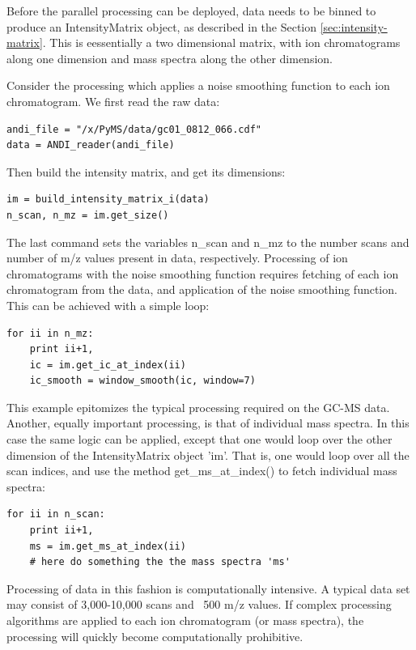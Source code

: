 Before the parallel processing can be deployed, data needs to be binned
to produce an IntensityMatrix object, as described in the Section
\ref{sec:intensity-matrix}. This is eessentially a two dimensional
matrix, with ion chromatograms along one dimension and mass spectra
along the other dimension.

Consider the processing which applies a noise smoothing function to
each ion chromatogram. We first read the raw data:

\begin{verbatim}
andi_file = "/x/PyMS/data/gc01_0812_066.cdf"
data = ANDI_reader(andi_file)
\end{verbatim}
 
Then build the intensity matrix, and get its dimensions:

\begin{verbatim}
im = build_intensity_matrix_i(data)
n_scan, n_mz = im.get_size()
\end{verbatim}

The last command sets the variables n\_scan and n\_mz to the number
scans and number of m/z values present in data, respectively.
Processing of ion chromatograms with the noise smoothing function
requires fetching of each ion chromatogram from the data, and
application of the noise smoothing function. This can be achieved 
with a simple loop: 

\begin{verbatim}
for ii in n_mz:
    print ii+1,
    ic = im.get_ic_at_index(ii)
    ic_smooth = window_smooth(ic, window=7)
\end{verbatim}

This example epitomizes the typical processing required on the
GC-MS data. Another, equally important processing, is that of
individual mass spectra. In this case the same logic can be
applied, except that one would loop over the other dimension
of the IntensityMatrix object 'im'. That is, one would loop
over all the scan indices, and use the method 
get\_ms\_at\_index() to fetch individual mass spectra:


\begin{verbatim}
for ii in n_scan:
    print ii+1,
    ms = im.get_ms_at_index(ii)
    # here do something the the mass spectra 'ms'
\end{verbatim}

Processing of data in this fashion is computationally intensive.
A typical data set may consist of 3,000-10,000 scans and ~500
m/z values. If complex processing algorithms are applied to
each ion chromatogram (or mass spectra), the processing will
quickly become computationally prohibitive.

